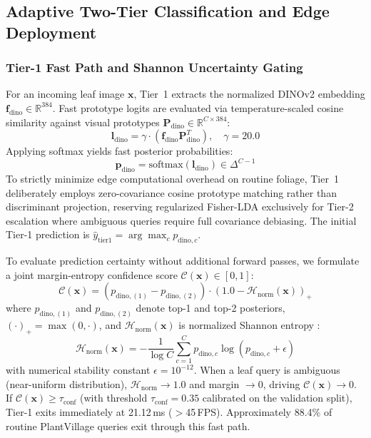 \documentclass[a4paper,fleqn,nologo]{cas-dc}
\begin{document}
\subsection{Adaptive Two-Tier Classification and Edge Deployment}
\label{sec:edge_cascade}

\subsubsection{Tier-1 Fast Path and Shannon Uncertainty Gating}
For an incoming leaf image $\mathbf{x}$, Tier~1 extracts the normalized DINOv2 embedding $\mathbf{f}_{\text{dino}} \in \mathbb{R}^{384}$. Fast prototype logits are evaluated via temperature-scaled cosine similarity against visual prototypes $\mathbf{P}_{\text{dino}} \in \mathbb{R}^{C \times 384}$:
\begin{equation}
    \label{eq:tier1_logits}
    \mathbf{l}_{\text{dino}} = \gamma \cdot \left(\mathbf{f}_{\text{dino}} \mathbf{P}_{\text{dino}}^T\right), \quad \gamma = 20.0
\end{equation}
Applying softmax yields fast posterior probabilities:
\begin{equation}
    \label{eq:tier1_softmax}
    \mathbf{p}_{\text{dino}} = \text{softmax}(\mathbf{l}_{\text{dino}}) \in \Delta^{C-1}
\end{equation}
To strictly minimize edge computational overhead on routine foliage, Tier~1 deliberately employs zero-covariance cosine prototype matching rather than discriminant projection, reserving regularized Fisher-LDA exclusively for Tier-2 escalation where ambiguous queries require full covariance debiasing. The initial Tier-1 prediction is $\hat{y}_{\text{tier1}} = \arg\max_c p_{\text{dino}, c}$.

To evaluate prediction certainty without additional forward passes, we formulate a joint margin-entropy confidence score $\mathcal{C}(\mathbf{x}) \in [0, 1]$:
\begin{equation}
    \label{eq:shannon_gate}
    \mathcal{C}(\mathbf{x}) = \left(p_{\text{dino}, (1)} - p_{\text{dino}, (2)}\right) \cdot \left(1.0 - \mathcal{H}_{\text{norm}}(\mathbf{x})\right)_+
\end{equation}
where $p_{\text{dino}, (1)}$ and $p_{\text{dino}, (2)}$ denote top-1 and top-2 posteriors, $(\cdot)_+ = \max(0, \cdot)$, and $\mathcal{H}_{\text{norm}}(\mathbf{x})$ is normalized Shannon entropy \cite{shannon1948mathematical}:
\begin{equation}
    \mathcal{H}_{\text{norm}}(\mathbf{x}) = -\frac{1}{\log C} \sum_{c=1}^C p_{\text{dino}, c} \log(p_{\text{dino}, c} + \epsilon)
\end{equation}
with numerical stability constant $\epsilon = 10^{-12}$. When a leaf query is ambiguous (near-uniform distribution), $\mathcal{H}_{\text{norm}} \to 1.0$ and margin $\to 0$, driving $\mathcal{C}(\mathbf{x}) \to 0$. If $\mathcal{C}(\mathbf{x}) \ge \tau_{\text{conf}}$ (with threshold $\tau_{\text{conf}} = 0.35$ calibrated on the validation split), Tier-1 exits immediately at 21.12\,ms ($>$45\,FPS). Approximately 88.4\% of routine PlantVillage queries exit through this fast path.
\end{document}
